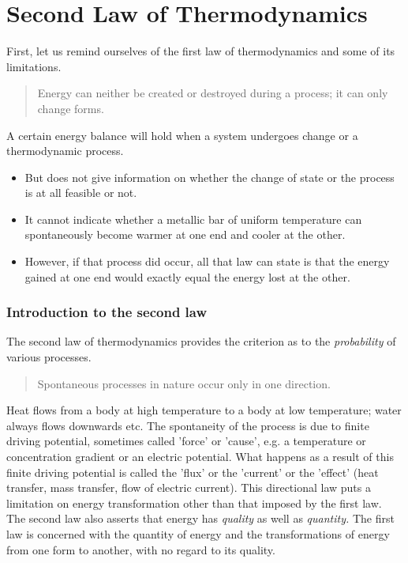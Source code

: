 \documentclass[class=report, crop=false, 12pt,a4paper]{standalone}
\begin{document}
\section{Second Law of Thermodynamics}
First, let us remind ourselves of the first law of thermodynamics and some of its limitations. 
\begin{quote}
  \begin{center}
    Energy can neither be created or destroyed during a process; it can only change forms.
  \end{center}
\end{quote}
A certain energy balance will hold when a system undergoes change or a thermodynamic process.
\begin{itemize}[noitemsep]
  \item But does not give information on whether the change of state or the process is at all feasible or not.
  \item It cannot indicate whether a metallic bar of uniform temperature can spontaneously become warmer at one end and cooler at the other.
  \item However, if that process did occur, all that law can state is that the energy gained at one end would exactly equal the energy lost at the other.
\end{itemize}
\subsubsection{Introduction to the second law}
The second law of thermodynamics provides the criterion as to the \emph{probability} of various processes. 
\begin{quote}
  \begin{center}
    Spontaneous processes in nature occur only in one direction. 
  \end{center}
\end{quote}
Heat flows from a body at high temperature to a body at low temperature; water always flows downwards etc. The spontaneity of the process is due to finite driving potential, sometimes called 'force' or 'cause', e.g. a temperature or concentration gradient or an electric potential. What happens as a result of this finite driving potential is called the 'flux' or the 'current' or the 'effect' (heat transfer, mass transfer, flow of electric current). This directional law puts a limitation on energy transformation other than that imposed by the first law. The second law also asserts that energy has \emph{quality} as well as \emph{quantity.} The first law is concerned with the quantity of energy and the transformations of energy from one form to another, with no regard to its quality. 
\end{document}
